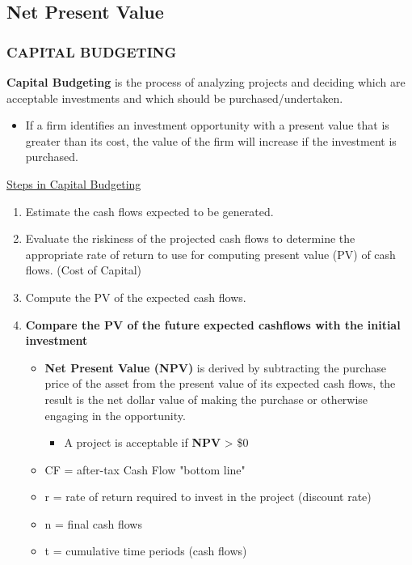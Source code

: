 \documentclass[12pt]{article}
\begin{document}
        \subsection{Net Present Value}
            \subsubsection{CAPITAL BUDGETING}
                \textbf{Capital Budgeting} is the process of analyzing projects and deciding which are acceptable investments and which should be purchased/undertaken.
                \begin{itemize}
                    \item If a firm identifies an investment opportunity with a present value that is greater than its cost, the value of the firm will
                    increase if the investment is purchased.
                \end{itemize}
                \underline{Steps in Capital Budgeting}
                \begin{enumerate}
                    \item Estimate the cash flows expected to be generated.
                    \item Evaluate the riskiness of the projected cash flows to determine the appropriate rate of return to use for computing present value
                    (PV) of cash flows. (Cost of Capital)
                    \item Compute the PV of the expected cash flows.
                    \item \textbf{Compare the PV of the future expected cashflows with the initial investment}
                        \begin{itemize}
                            \item \textbf{Net Present Value (NPV)} is derived by subtracting the purchase price of the asset from the present value of its expected cash
                            flows, the result is the net dollar value of making the purchase or otherwise engaging in the opportunity.
                                \begin{itemize}
                                    \item A project is acceptable if \textbf{NPV} > \$0
                                \end{itemize}
                            \item CF = after-tax Cash Flow "bottom line"
                            \item r = rate of return required to invest in the project (discount rate)
                            \item n = final cash flows
                            \item t = cumulative time periods (cash flows)
                        \end{itemize}                            
                \end{enumerate}
        
\end{document}
